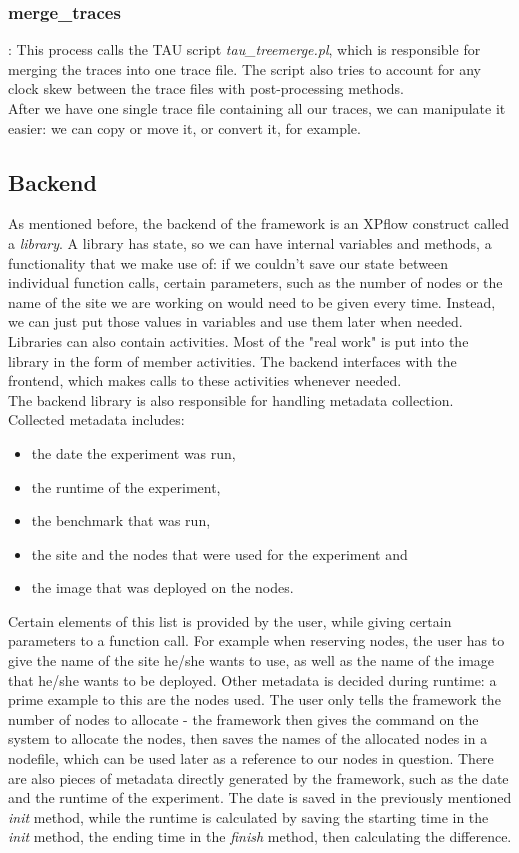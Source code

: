 \subsubsection{merge\_traces}: This process calls the TAU\cite{sm06}
script \emph{tau\_treemerge.pl}, which is responsible for merging the
traces into one trace file. The script also tries to account for any
clock skew between the trace files with post-processing methods.\\
After we have one single trace file containing all our traces, we can
manipulate it easier: we can copy or move it, or convert it, for
example.
\subsection{Backend}
As mentioned before, the backend of the framework is an XPflow
construct called a \emph{library}. A library has state, so we can have
internal variables and methods, a functionality that we make use of:
if we couldn't save our state between individual function calls,
certain parameters, such as the number of nodes or the name of the
site we are working on would need to be given every time. Instead, we
can just put those values in variables and use them later when
needed.\\
Libraries can also contain activities. Most of the "real work" is put
into the library in the form of member activities. The backend
interfaces with the frontend, which makes calls to these activities
whenever needed.\\
The backend library is also responsible for handling metadata
collection. Collected metadata includes:
\begin{itemize}
\item the date the experiment was run,
\item the runtime of the experiment,
\item the benchmark that was run,
\item the site and the nodes that were used for the experiment and
\item the image that was deployed on the nodes.
\end{itemize}
Certain elements of this list is provided by the user, while giving
certain parameters to a function call. For example when reserving
nodes, the user has to give the name of the site he/she wants to use,
as well as the name of the image that he/she wants to be
deployed. Other metadata is decided during runtime: a prime example to
this are the nodes used. The user only tells the framework the number
of nodes to allocate - the framework then gives the command on the
system to allocate the nodes, then saves the names of the allocated
nodes in a nodefile, which can be used later as a reference to our
nodes in question. There are also pieces of metadata directly
generated by the framework, such as the date and the runtime of the
experiment. The date is saved in the previously mentioned \emph{init}
method, while the runtime is calculated by saving the starting time in
the \emph{init} method, the ending time in the \emph{finish} method,
then calculating the difference.
